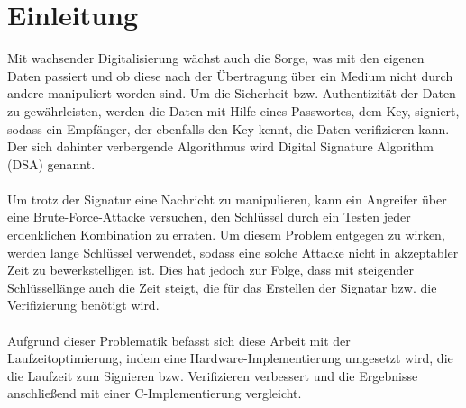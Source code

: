\chapter{Einleitung}
Mit wachsender Digitalisierung wächst auch die Sorge, was mit den eigenen Daten passiert und ob diese nach der Übertragung über ein Medium nicht durch andere manipuliert worden sind. Um die Sicherheit bzw. Authentizität der Daten zu gewährleisten, werden die Daten mit Hilfe eines Passwortes, dem Key, signiert, sodass ein Empfänger, der ebenfalls den Key kennt, die Daten verifizieren kann. Der sich dahinter verbergende Algorithmus wird Digital Signature Algorithm (DSA) genannt.
\\ \\
Um trotz der Signatur eine Nachricht zu manipulieren, kann ein Angreifer über eine Brute-Force-Attacke versuchen, den Schlüssel durch ein Testen jeder erdenklichen Kombination zu erraten. Um diesem Problem entgegen zu wirken, werden lange Schlüssel verwendet, sodass eine solche Attacke nicht in akzeptabler Zeit zu bewerkstelligen ist. Dies hat jedoch zur Folge, dass mit steigender Schlüssellänge auch die Zeit steigt, die für das Erstellen der Signatar bzw. die Verifizierung benötigt wird.
\\ \\
Aufgrund dieser Problematik befasst sich diese Arbeit mit der Laufzeitoptimierung, indem eine Hardware-Implementierung umgesetzt wird, die die Laufzeit zum Signieren bzw. Verifizieren verbessert und die Ergebnisse anschließend mit einer C-Implementierung vergleicht.
